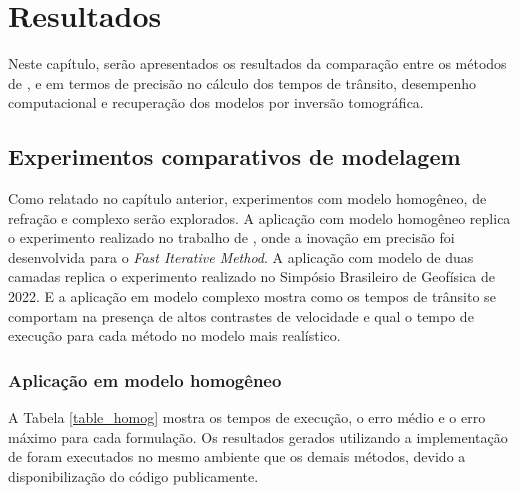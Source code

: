 \chapter{Resultados}
\label{ch:resultados}

Neste capítulo, serão apresentados os resultados da comparação entre os métodos de ,  e  em termos de precisão no cálculo dos tempos de trânsito, desempenho computacional e recuperação dos modelos por inversão tomográfica. 

\section{Experimentos comparativos de modelagem}

Como relatado no capítulo anterior, experimentos com modelo homogêneo, de refração e complexo serão explorados. A aplicação com modelo homogêneo replica o experimento realizado no trabalho de , onde a inovação em precisão foi desenvolvida para o \textit{Fast Iterative Method}. A aplicação com modelo de duas camadas replica o experimento realizado no Simpósio Brasileiro de Geofísica de 2022. E a aplicação em modelo complexo mostra como os tempos de trânsito se comportam na presença de altos contrastes de velocidade e qual o tempo de execução para cada método no modelo mais realístico.    

\subsection*{Aplicação em modelo homogêneo}

A Tabela \ref{table_homog} mostra os tempos de execução, o erro médio e o erro máximo para cada formulação. Os resultados gerados utilizando a implementação de  foram executados no mesmo ambiente que os demais métodos, devido a disponibilização do código publicamente.   

